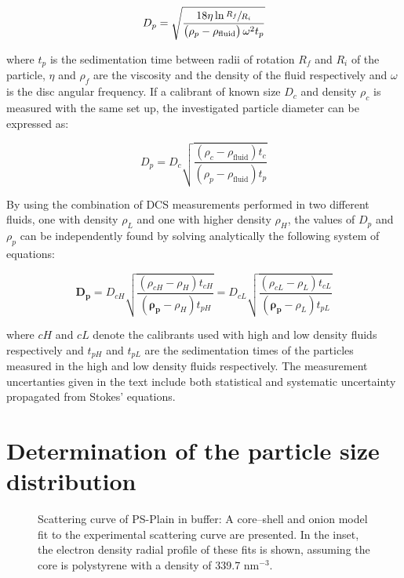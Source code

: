 \begin{equation}
D_p=\sqrt{\frac{18\eta\ln\sfrac{R_f}{R_i}}{\left( \rho_p - \rho_{\text{fluid}} \right)\omega^2 t_p}}
\label{eq:stokes}
\end{equation}

where $t_p$ is the sedimentation time between radii of rotation $R_f$ and $R_i$ of the particle, $\eta$ and $\rho_f$ are the viscosity and the density of the fluid respectively and $\omega$ is the disc angular frequency. If a calibrant of known size $D_c$ and density $\rho_c$ is measured with the same set up, the investigated particle diameter can be expressed as:

\begin{equation}
D_p=D_c\sqrt{\frac{\left( \rho_c - \rho_{\text{fluid}} \right) t_c}{\left( \rho_p - \rho_{\text{fluid}} \right) t_p}}
\label{eq:software}
\end{equation}

By using the combination of DCS measurements performed in two different fluids, one with density $\rho_L$ and one with higher density $\rho_H$, the values of $D_p$ and $\rho_p$ can be independently found by solving analytically the following system of equations:

\begin{equation}
\bm{D_p} = D_{cH}\sqrt{\frac{\left( \rho_{cH} - \rho_H \right) t_{cH}}{\left( \bm{\rho_p} - \rho_H \right) t_{pH}}} = D_{cL}\sqrt{\frac{\left( \rho_{cL} - \rho_L \right) t_{cL}}{\left( \bm{\rho_p} - \rho_L \right) t_{pL}}}
\label{eq:DCS_sys}
\end{equation}

where $cH$ and $cL$ denote the calibrants used with high and low density fluids respectively and $t_{pH}$ and $t_{pL}$ are the sedimentation times of the particles measured in the high and low density fluids respectively. The measurement uncertanties given in the text include both statistical and systematic uncertainty propagated from Stokes' equations.

\section{Determination of the particle size distribution}
\label{sec:size_validation}

\begin{figure}
	\begin{center}
		
	\end{center}
	\caption[Scattering curve of PS-Plain in buffer.]{Scattering curve of PS-Plain in buffer: A core–shell and onion model fit to the experimental scattering curve are presented. In the inset, the electron density radial profile
	\label{fig:PSPlainSingleContrastSAXS}
of these fits is shown, assuming the core is polystyrene with a density of 339.7 nm$^{-3}$.}
\end{figure}

